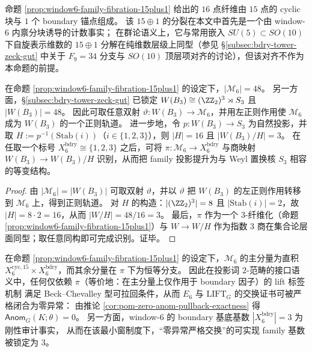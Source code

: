 \begin{remark}[关于 \texorpdfstring{$16=15\oplus 1$}{16=15+1} 的维数对齐]\label{rem:window6-15plus1-dim-alignment}
命题 \ref{prop:window6-family-fibration-15plus1} 给出的 \(16\) 点纤维由 \(15\) 点的 cyclic 块与 \(1\) 个 boundary 锚点组成。
该 \(15\oplus 1\) 的分裂在本文中首先是一个由 window-\(6\) 内禀分块诱导的计数事实；
在群论语义上，它与常用嵌入 \(SU(5)\subset SO(10)\) 下自旋表示维数的 \(15\oplus 1\) 分解在纯维数层级上同型（参见 \S\ref{subsec:bdry-tower-zeck-gut} 中关于 \(F_9=34\) 分支与 \(SO(10)\) 顶层项对齐的讨论），但该对齐不作为本命题的前提。
\end{remark}

\begin{corollary}[Weyl--家族等势：\texorpdfstring{$|\mathcal M_6|=|W(B_3)|$}{|M6|=|W|} 的正则轨道实现]\label{cor:window6-weyl-family-equipotential}
在命题 \ref{prop:window6-family-fibration-15plus1} 的设定下，\(|\mathcal M_6|=48\)。
另一方面，\S\ref{subsec:bdry-tower-zeck-gut} 已锁定
\(
W(B_3)\cong (\ZZ_2)^3\rtimes S_3
\)
且 \(|W(B_3)|=48\)。
因此可取任意双射 \(\vartheta:W(B_3)\to\mathcal M_6\)，并用左正则作用使 \(\mathcal M_6\) 成为 \(W(B_3)\) 的一个正则轨道。
进一步地，令 \(p:W(B_3)\to S_3\) 为自然投影，并取 \(H:=p^{-1}(\mathrm{Stab}(i))\)（\(i\in\{1,2,3\}\)），则 \(|H|=16\) 且 \(|W(B_3)/H|=3\)。
在任取一个标号 \(X_6^{\mathrm{bdry}}\cong\{1,2,3\}\) 之后，可将 \(\pi:\mathcal M_6\to X_6^{\mathrm{bdry}}\) 与商映射 \(W(B_3)\to W(B_3)/H\) 识别，从而把 family 投影提升为与 Weyl 置换核 \(S_3\) 相容的等变结构。
\end{corollary}
\begin{proof}
由 \(|\mathcal M_6|=|W(B_3)|\) 可取双射 \(\vartheta\)，并以 \(\vartheta\) 把 \(W(B_3)\) 的左正则作用转移到 \(\mathcal M_6\) 上，得到正则轨道。
对 \(H\) 的构造：\(|(\ZZ_2)^3|=8\) 且 \(|\mathrm{Stab}(i)|=2\)，故 \(|H|=8\cdot 2=16\)，从而 \(|W/H|=48/16=3\)。
最后，\(\pi\) 作为一个 \(3\)-纤维化（命题 \ref{prop:window6-family-fibration-15plus1}）与 \(W\to W/H\) 作为指数 \(3\) 商在集合论层面同型；取任意同构即可完成识别。证毕。
\end{proof}

\begin{corollary}\label{cor:window6-three-family-zero-anom}
在命题 \ref{prop:window6-family-fibration-15plus1} 的设定下，\(\mathcal M_6\) 的主分量为直积 \(X_6^{\mathrm{cyc},15}\times X_6^{\mathrm{bdry}}\)，而其余分量在 \(\pi\) 下为恒等分支。
因此在投影词 \(2\)-范畴的接口语义中，任何仅依赖 \(\pi\)（等价地：在主分量上仅作用于 boundary 因子）的 lift 标签机制
满足 Beck--Chevalley 型可拉回条件，从而 \(E_6\) 与 \(\mathrm{LIFT}_G\) 的交换证书可被严格闭合为零异常：
由推论 \ref{cor:pom-zero-anom-pullback-exactness} 得 \(\mathsf{Anom}_G(K;\theta)=0\)。
另一方面，window-\(6\) 的 boundary 基底基数 \(|X_6^{\mathrm{bdry}}|=3\) 为刚性审计事实，
从而在该最小窗制度下，“零异常严格交换”的可实现 family 基数被锁定为 \(3\)。
\end{corollary}

